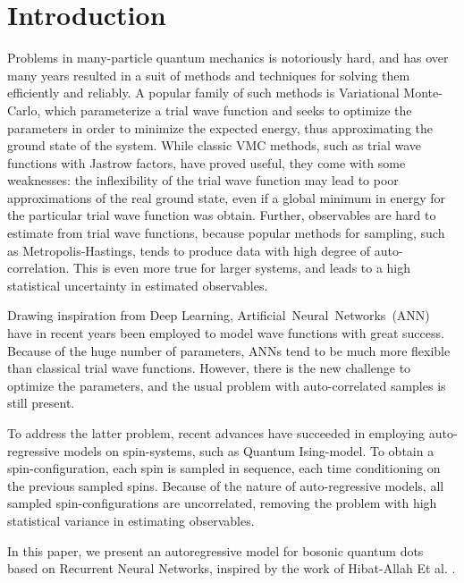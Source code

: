 \section{Introduction}

Problems in many-particle quantum mechanics is notoriously hard, and has over
many years resulted in a suit of methods and techniques for solving them
efficiently and reliably. A popular family of such methods is Variational
Monte-Carlo, which parameterize a trial wave function and seeks to optimize the
parameters in order to minimize the expected energy, thus approximating the
ground state of the system. While classic VMC methods, such as trial wave
functions with Jastrow factors, have proved useful, they come with some
weaknesses: the inflexibility of the trial wave function may lead to poor
approximations of the real ground state, even if a global minimum in energy for
the particular trial wave function was obtain. Further, observables are hard to
estimate from trial wave functions, because popular methods for sampling, such
as Metropolis-Hastings, tends to produce data with high degree of auto-correlation\cite{Blocking}. This
is even more true for larger systems, and leads to a high statistical
uncertainty in estimated observables. 

Drawing inspiration from Deep Learning, Artificial~Neural~Networks~(ANN) have in recent years been employed to model wave functions with great success\cite{pfau2019abinitio}.
Because of the huge number of parameters, ANNs tend to be
much more flexible than classical trial wave functions. However, there is the
new challenge to optimize the parameters, and the usual problem with
auto-correlated samples is still present. 

To address the latter problem, recent advances\cite{hibatallah2020recurrent,Sharir_2020} have  succeeded in
employing auto-regressive models on spin-systems, such as Quantum Ising-model.
To obtain a spin-configuration, each spin is sampled in sequence, each time
conditioning on the previous sampled spins. Because of the nature of
auto-regressive models, all sampled spin-configurations are uncorrelated,
removing the problem with high statistical variance in estimating observables. 

In this paper, we present an autoregressive model for bosonic quantum dots based
on Recurrent Neural Networks, inspired by the work of Hibat-Allah Et al. \cite{hibatallah2020recurrent}. 

